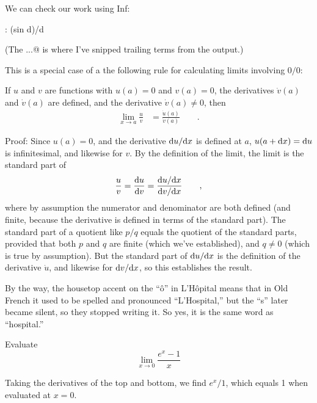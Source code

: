 \pagebreak

We can check our work using Inf:
\begin{Code}
  \ii : (sin d)/d
\end{Code}
(The \verb@...@ is where I've snipped trailing terms from the output.)

This is a special case of a the following rule for calculating limits involving $0/0$:

\begin{important}
If $u$ and $v$ are functions with $u(a)=0$ and $v(a)=0$, the derivatives $\dot{v}(a)$ and $\dot{v}(a)$ are defined,
and the derivative $\dot{v}(a)\ne 0$,
then
\begin{align*}
  \lim_{x\rightarrow a} \frac{u}{v} &= \frac{\dot{u}(a)}{\dot{v}(a)} \qquad .
\end{align*}
\end{important}

Proof: Since $u(a)=0$, and the derivative $\textup{d} u/\textup{d} x$ is defined at $a$, $u(a+\textup{d} x)=\textup{d} u$ is infinitesimal, and likewise for $v$. By the definition
of the limit, the limit is the standard part of
\begin{equation*}
  \frac{u}{v} = \frac{\textup{d} u}{\textup{d} v} = \frac{\textup{d} u/\textup{d} x}{\textup{d} v/\textup{d} x} \qquad ,
\end{equation*}
where by assumption the numerator and denominator are both defined (and finite, because the derivative
is defined in terms of the standard part). The standard part of a quotient like $p/q$ equals the quotient of the
standard parts, provided that both $p$ and $q$ are finite (which we've established), and $q \ne 0$ (which is
true by assumption). But the standard part of $\textup{d} u/\textup{d} x$ is the definition of the derivative $\dot{u}$, and
likewise for  $\textup{d} v/\textup{d} x$, so this establishes the result.

By the way, the housetop accent on the ``\^{o}'' in L'H\^{o}pital means that in Old French it used to be spelled and
pronounced ``L'Hospital,'' but the ``s'' later became silent, so they stopped writing it. So yes, it is the
same word as ``hospital.''

\begin{eg}
\egquestion Evaluate
\begin{equation*}
  \lim_{x\rightarrow 0} \frac{e^x-1}{x}
\end{equation*}

\eganswer Taking the derivatives of the top and bottom, we find $e^x/1$, which equals 1 when
evaluated at $x=0$.
\end{eg}

